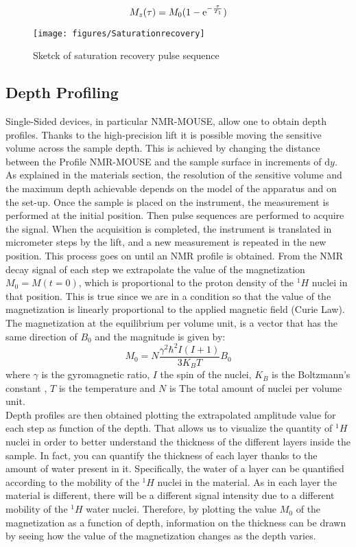 \documentclass[a4paper,11pt]{report}
\begin{document}
\begin{equation}
	\large{ M_z(\tau)=M_0(1- \mathrm{e}^{- \frac{\tau}{T_1}})}
\end{equation}


\begin{figure}[h]
      	\centering
      	\texttt{[image: figures/Saturationrecovery]}
      	\caption{Sketck of saturation recovery pulse sequence}\label{satrecovery}
      \end{figure}




\subsection{Depth Profiling}

Single-Sided devices, in particular NMR-MOUSE, allow one to obtain depth profiles. Thanks to the high-precision lift it is possible moving the sensitive volume across the sample depth. This is achieved by changing the distance between the Profile NMR-MOUSE and the sample surface in increments of $\mathrm{d}y$. As explained in the materials section, the resolution of the sensitive volume and the maximum depth achievable depends on the model of the apparatus and on the set-up.
Once the sample is placed on the instrument, the measurement is performed at the initial position. Then pulse sequences are performed to acquire the signal. When the acquisition is completed, the instrument is translated in micrometer steps by the lift, and a new measurement is repeated in the new position. This process goes on until an NMR profile is obtained.
  From the NMR decay signal of each step we extrapolate the value of the magnetization $M_0=M(t=0)$,  which is proportional to the proton density of the $^1H$ nuclei in that position. This is true since we are in a condition so that the value of the magnetization is linearly proportional to the applied magnetic field (Curie Law). The magnetization at the equilibrium per volume unit, is a vector that has the same direction of $B_0$ and the magnitude is given by:
\begin{equation} \label{modulo magnetizzazione}
	M_0=N \frac{\gamma^2 \hbar^2 I (I+1)}{3K_BT}B_0
\end{equation}
where $\gamma$ is the gyromagnetic ratio, $I$ the spin of the nuclei, $K_B$ is the Boltzmann's constant , $T$ is the temperature and  $N$ is The total amount of nuclei per volume unit.\\
Depth profiles are then obtained plotting the extrapolated amplitude value for each step as function of the depth. That allows us to visualize the quantity of $^1H$ nuclei in order to better understand the thickness of the different layers inside the sample. In fact, you can quantify the thickness of each layer thanks to the amount of water present in it. Specifically, the water of a layer can be quantified according to the mobility of the $^1H$ nuclei in the material. As in each layer the material is different, there will be a different signal intensity due to a different mobility of the $^1H$ water nuclei. Therefore, by plotting the value $M_0$ of the magnetization as a function of depth, information on the thickness can be drawn by seeing how the value of the magnetization changes as the depth varies.
\end{document}

